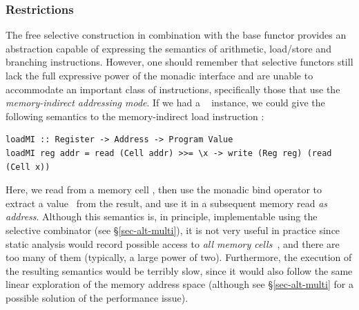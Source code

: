 \subsubsection{Restrictions}

The free selective construction in combination with the base functor 
provides an abstraction capable of expressing the semantics of arithmetic,
load/store and branching instructions. However, one should remember that
selective functors still lack the full expressive power of the monadic interface
and are unable to accommodate an important class of instructions, specifically
those that use the \emph{memory-indirect addressing mode}. If we had a
~ instance, we could give the following semantics to the
memory-indirect load instruction :

\vspace{1mm}
\begin{verbatim}
loadMI :: Register -> Address -> Program Value
loadMI reg addr = read (Cell addr) >>= \x -> write (Reg reg) (read (Cell x))
\end{verbatim}
\vspace{1mm}

\noindent
Here, we read from a memory cell , then use the monadic bind operator
to extract a value~ from the result, and use it in a subsequent memory
read \emph{as address}. Although this semantics is, in principle, implementable
using the selective  combinator (see \S\ref{sec-alt-multi}), it is not
very useful in practice since static analysis would record possible access to
\emph{all memory cells}~, and there are too many of them (typically, a
large power of two). Furthermore, the execution of the resulting semantics would
be terribly slow, since it would also follow the same linear exploration of the
memory address space (although see \S\ref{sec-alt-multi} for a possible solution
of the performance issue).

